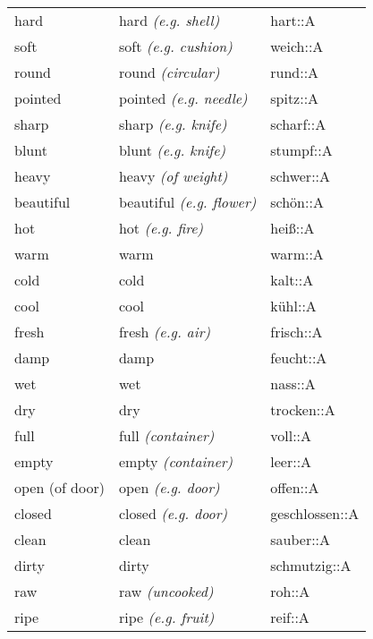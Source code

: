 \begin{center}
\begin{longtable}{lll}
{\sc \lowercase{	HARD	}}	&	hard	\textit{\footnotesize (e.g. shell)}	&	hart::A	\\
{\sc \lowercase{	SOFT	}}	&	soft	\textit{\footnotesize (e.g. cushion)}	&	weich::A	\\
{\sc \lowercase{	ROUND	}}	&	round	\textit{\footnotesize (circular)}	&	rund::A	\\
{\sc \lowercase{	POINTED	}}	&	pointed	\textit{\footnotesize (e.g. needle)}	&	spitz::A	\\
{\sc \lowercase{	SHARP	}}	&	sharp	\textit{\footnotesize (e.g. knife)}	&	scharf::A	\\
{\sc \lowercase{	BLUNT	}}	&	blunt	\textit{\footnotesize (e.g. knife)}	&	stumpf::A	\\
{\sc \lowercase{	HEAVY	}}	&	heavy	\textit{\footnotesize (of weight)}	&	schwer::A	\\
{\sc \lowercase{	BEAUTIFUL	}}	&	beautiful	\textit{\footnotesize (e.g. flower)}	&	schön::A	\\
{\sc \lowercase{	HOT	}}	&	hot	\textit{\footnotesize (e.g. fire)}	&	heiß::A	\\
{\sc \lowercase{	WARM	}}	&	warm		&	warm::A	\\
{\sc \lowercase{	COLD	}}	&	cold		&	kalt::A	\\
{\sc \lowercase{	COOL	}}	&	cool		&	kühl::A	\\
{\sc \lowercase{	FRESH	}}	&	fresh	\textit{\footnotesize (e.g. air)}	&	frisch::A	\\
{\sc \lowercase{	DAMP	}}	&	damp		&	feucht::A	\\
{\sc \lowercase{	WET	}}	&	wet		&	nass::A	\\
{\sc \lowercase{	DRY	}}	&	dry		&	trocken::A	\\
{\sc \lowercase{	FULL	}}	&	full	\textit{\footnotesize (container)}	&	voll::A	\\
{\sc \lowercase{	EMPTY	}}	&	empty	\textit{\footnotesize (container)}	&	leer::A	\\
{\sc \lowercase{	OPEN \footnotesize (OF DOOR)	}}	&	open	\textit{\footnotesize (e.g. door)}	&	offen::A	\\
{\sc \lowercase{	CLOSED	}}	&	closed	\textit{\footnotesize (e.g. door)}	&	geschlossen::A	\\
{\sc \lowercase{	CLEAN	}}	&	clean		&	sauber::A	\\
{\sc \lowercase{	DIRTY	}}	&	dirty		&	schmutzig::A	\\
{\sc \lowercase{	RAW	}}	&	raw	\textit{\footnotesize (uncooked)}	&	roh::A	\\
{\sc \lowercase{	RIPE	}}	&	ripe	\textit{\footnotesize (e.g. fruit)}	&	reif::A	\\

\end{longtable}
\end{center}
